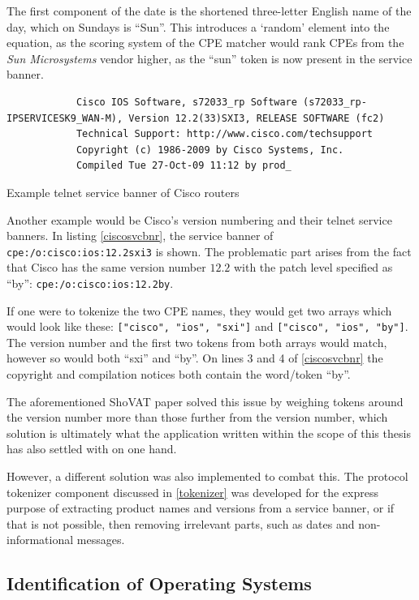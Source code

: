 \documentclass[a4paper,12pt]{article}
\begin{document}
	The first component of the date is the shortened three-letter English name of the day, which on Sundays is ``Sun''. This introduces a `random' element into the equation, as the scoring system of the CPE matcher would rank CPEs from the \textit{Sun Microsystems} vendor higher, as the ``sun'' token is now present in the service banner.
	
	\begin{listing}[H]
		\begin{verbatim}
			Cisco IOS Software, s72033_rp Software (s72033_rp-IPSERVICESK9_WAN-M), Version 12.2(33)SXI3, RELEASE SOFTWARE (fc2)
			Technical Support: http://www.cisco.com/techsupport
			Copyright (c) 1986-2009 by Cisco Systems, Inc.
			Compiled Tue 27-Oct-09 11:12 by prod_
		\end{verbatim}
		\caption{Example telnet service banner of Cisco routers}
		\label{ciscosvcbnr}
	\end{listing}

	Another example would be Cisco's version numbering and their telnet service banners. In listing \ref{ciscosvcbnr}, the service banner of \texttt{cpe:/o:cisco:ios:12.2sxi3} is shown. The problematic part arises from the fact that Cisco has the same version number $12.2$ with the patch level specified as ``by'': \texttt{cpe:/o:cisco:ios:12.2by}.
	
	If one were to tokenize the two CPE names, they would get two arrays which would look like these: \texttt{["cisco", "ios", "sxi"]} and \texttt{["cisco", "ios", "by"]}. The version number and the first two tokens from both arrays would match, however so would both ``sxi'' and ``by''. On lines 3 and 4 of \ref{ciscosvcbnr} the copyright and compilation notices both contain the word/token ``by''.

	The aforementioned ShoVAT\cite{shovat15} paper solved this issue by weighing tokens around the version number more than those further from the version number, which solution is ultimately what the application written within the scope of this thesis has also settled with on one hand.
	
	However, a different solution was also implemented to combat this. The protocol tokenizer component discussed in \ref{tokenizer} was developed for the express purpose of extracting product names and versions from a service banner, or if that is not possible, then removing irrelevant parts, such as dates and non-informational messages.
	
\subsection{Identification of Operating Systems} \label{opsysmatcher}
 
\end{document}
